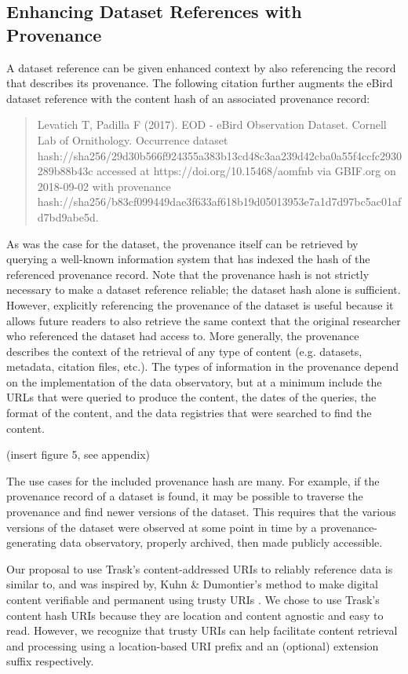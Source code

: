 \subsection*{Enhancing Dataset References with Provenance}

A dataset reference can be given enhanced context by also referencing the record that describes its provenance. The following citation further augments the eBird dataset reference with the content hash of an associated provenance record:

\begin{quote}
    Levatich T, Padilla F (2017). EOD - eBird Observation Dataset. Cornell Lab of Ornithology. Occurrence dataset hash://sha256/29d30b566f924355a383b13cd48c3aa239d42cba0a55f4ccfc2930289b88b43c accessed at https://doi.org/10.15468/aomfnb via GBIF.org on 2018-09-02 with provenance hash://sha256/b83cf099449dae3f633af618b19d05013953e7a1d7d97bc5ac01afd7bd9abe5d.
\end{quote}

As was the case for the dataset, the provenance itself can be retrieved by querying a well-known information system that has indexed the hash of the referenced provenance record. Note that the provenance hash is not strictly necessary to make a dataset reference reliable; the dataset hash alone is sufficient. However, explicitly referencing the provenance of the dataset is useful because it allows future readers to also retrieve the same context that the original researcher who referenced the dataset had access to. More generally, the provenance describes the context of the retrieval of any type of content (e.g. datasets, metadata, citation files, etc.). The types of information in the provenance depend on the implementation of the data observatory, but at a minimum include the URLs that were queried to produce the content, the dates of the queries, the format of the content, and the data registries that were searched to find the content.

% 
(insert figure 5, see appendix)

 The use cases for the included provenance hash are many. For example, if the provenance record of a dataset is found, it may be possible to traverse the provenance and find newer versions of the dataset. This requires that the various versions of the dataset were observed at some point in time by a provenance-generating data observatory, properly archived, then made publicly accessible.

 Our proposal to use Trask's content-addressed URIs to reliably reference data is similar to, and was inspired by, Kuhn \& Dumontier's method to make digital content verifiable and permanent using trusty URIs \citep{Kuhn_2015}. We chose to use Trask's content hash URIs because they are location and content agnostic and easy to read. However, we recognize that trusty URIs can help facilitate content retrieval and processing using a location-based URI prefix and an (optional) extension suffix respectively. 

